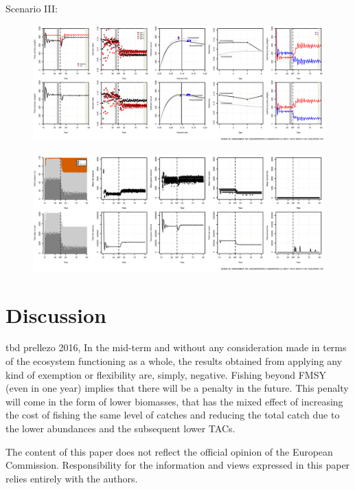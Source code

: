 \documentclass[12pt,oneline,a4paper,numbib]{ouparticle}
\begin{document}
Scenario III:


\begin{figure}[!ht]
\centering
\includegraphics[width=\textwidth]{Figures/Catch_LO.eps} 
\caption{}
\label{fig:catch_lo}
\end{figure}

\begin{figure}[!ht]
\centering
\includegraphics[width=\textwidth]{Figures/Effort_LO.eps} 
\caption{}
\label{fig:effort_lo}
\end{figure}

\section{Discussion}
\label{sec4}
tbd
prellezo 2016, In the mid-term and without any consideration made in terms of the ecosystem functioning as a whole, the results obtained from applying any kind of exemption or flexibility are, simply, negative. Fishing beyond FMSY (even in one year) implies that there will be a penalty in the future. This penalty will come in the form of lower biomasses, that has the mixed effect of increasing the cost of fishing the same level of catches and reducing the total catch due to the lower abundances and the subsequent lower TACs.

\begin{notes}[Acknowledgements]
The content of this paper does not reflect the official opinion of the European Commission. Responsibility for the information and views expressed in this paper relies entirely with the authors.
\end{notes}



\end{document}
